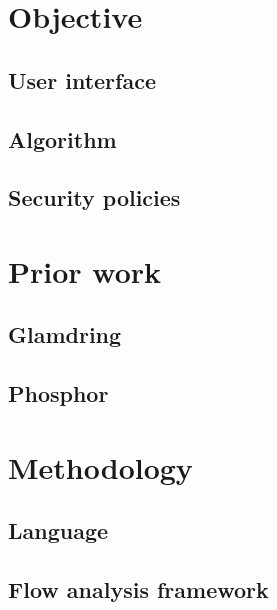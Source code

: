 \documentclass[a4paper, 12pt]{article}
\begin{document}
\section{Objective}
\subsection{User interface}

\subsection{Algorithm}

\subsection{Security policies}

\section{Prior work}
\subsection{Glamdring}

\subsection{Phosphor}

\section{Methodology}
\subsection{Language}

\subsection{Flow analysis framework}

\subsection{}



{}
\end{document}
